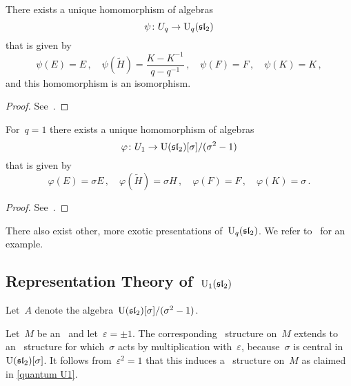 \documentclass[a4paper, 11pt, oneside]{scrartcl}
\begin{document}
\begin{proposition}
  There exists a unique homomorphism of algebras
  \[
    \psi
    \colon
    U_q
    \to
    \operatorname{U}_q(\mathfrak{sl}_2)
  \]
  that is given by
  \[
    \psi(E) = E \,,
    \quad
    \psi(\widetilde{H}) = \frac{K - K^{-1}}{q - q^{-1}} \,,
    \quad
    \psi(F) = F \,,
    \quad
    \psi(K) = K \,,
  \]
  and this homomorphism is an isomorphism.
\end{proposition}

\begin{proof}
 See~{\cite[Proposition~VI.2.1]{kassel_quantum}}.
\end{proof}

\begin{proposition}
  For~$q = 1$ there exists a unique homomorphism of algebras
  \[
    \varphi
    \colon
    U_1
    \to
    \operatorname{U}(\mathfrak{sl}_2)[\sigma]/(\sigma^2 - 1)
  \]
  that is given by
  \[
    \varphi(E) = \sigma E \,,
    \quad
    \varphi(\widetilde{H}) = \sigma H \,,
    \quad
    \varphi(F) = F \,,
    \quad
    \varphi(K) = \sigma \,.
  \]
\end{proposition}

\begin{proof}
  See~\cite[Proof of Proposition~VI.2.2]{kassel_quantum}.
\end{proof}

\begin{remark}
  There also exist other, more exotic presentations of~$\operatorname{U}_q(\mathfrak{sl}_2)$.
  We refer to~\cite{equitable_presentation} for an example.
\end{remark}




\subsection{Representation Theory of~$\operatorname{U}_1(\mathfrak{sl}_2)$}
\label{representation theory of U1}

Let~$A$ denote the algebra~$\operatorname{U}(\mathfrak{sl}_2)[\sigma]/(\sigma^2 - 1)$.

Let~$M$ be an~ and let~$\varepsilon = \pm 1$.
The corresponding~ structure on~$M$ extends to an~ structure for which~$\sigma$ acts by multiplication with~$\varepsilon$, because~$\sigma$ is central in~$\operatorname{U}(\mathfrak{sl}_2)[\sigma]$.
It follows from~$\varepsilon^2 = 1$ that this induces a~ structure on~$M$ as claimed in \cref{quantum U1}.
\end{document}
